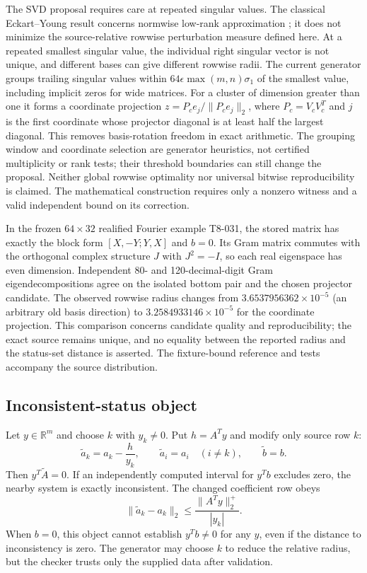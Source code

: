 \documentclass[11pt]{article}
\theoremstyle{definition}
\newcommand{\R}{\mathbb{R}}
\begin{document}
The SVD proposal requires care at repeated singular values. The classical
Eckart--Young result concerns normwise low-rank approximation
\citep{EckartYoung1936}; it does not minimize the source-relative rowwise perturbation measure
defined here. At a repeated smallest singular value, the individual right
singular vector is not unique, and different bases can give different
rowwise radii. The current generator groups trailing singular values within
$64\epsilon\max(m,n)\sigma_1$ of the smallest value, including implicit
zeros for wide matrices. For a cluster of dimension greater than one it
forms a coordinate projection $z=P_c e_j/\|P_c e_j\|_2$, where
$P_c=V_cV_c^T$ and $j$ is the first coordinate whose projector diagonal is
at least half the largest diagonal. This removes basis-rotation freedom
in exact arithmetic. The grouping window and coordinate selection are
generator heuristics, not certified multiplicity or rank tests; their
threshold boundaries can still change the proposal. Neither global
rowwise optimality nor universal bitwise reproducibility is claimed.
The mathematical construction requires only
a nonzero witness and a valid independent bound on its correction.

In the frozen $64\times32$ realified Fourier example T8-031, the stored
matrix has exactly the block form $[X,-Y;Y,X]$ and $b=0$. Its Gram matrix
commutes with the orthogonal complex structure $J$ with $J^2=-I$, so each
real eigenspace has even dimension. Independent 80- and 120-decimal-digit
Gram eigendecompositions agree on the isolated bottom pair and the chosen
projector candidate. The observed rowwise radius changes from
$3.6537956362\times10^{-5}$ (an arbitrary old basis direction) to
$3.2584933146\times10^{-5}$ for the coordinate projection. This comparison
concerns candidate quality and reproducibility; the exact source remains
unique, and no equality between the reported radius and the status-set
distance is asserted. The fixture-bound reference and tests accompany
the source distribution.

\subsection{Inconsistent-status object}
Let $y\in\R^m$ and choose $k$ with $y_k\ne0$. Put $h=A^Ty$ and modify only source row $k$:
\[
\widetilde a_k=a_k-\frac{h}{y_k},
\qquad \widetilde a_i=a_i\quad(i\ne k),
\qquad \widetilde b=b.
\]
Then $y^T\widetilde A=0$. If an independently computed interval for $y^Tb$ excludes zero, the nearby system is exactly inconsistent. The changed coefficient row obeys
\[
\|\widetilde a_k-a_k\|_2
\le \frac{\|A^Ty\|_2^+}{|y_k|}.
\]
When $b=0$, this object cannot establish $y^Tb\ne0$ for any $y$, even if the distance to inconsistency is zero. The generator may choose $k$ to reduce the relative radius, but the checker trusts only the supplied data after validation.
\end{document}
